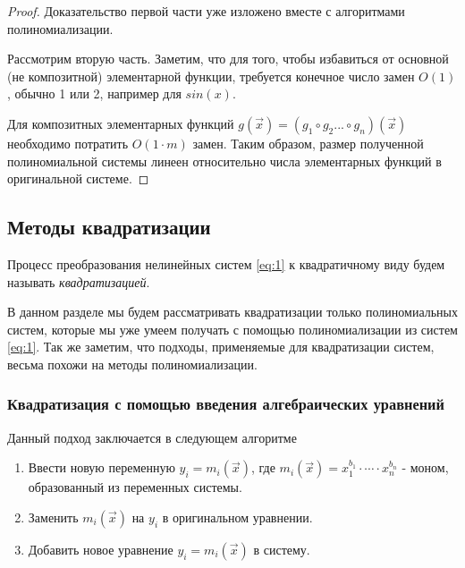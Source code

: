 \begin{proof}
    Доказательство первой части уже изложено вместе с алгоритмами полиномиализации.
    
    Рассмотрим вторую часть.
    Заметим, что для того, чтобы избавиться от основной (не композитной) элементарной функции,
    требуется конечное число замен $O(1)$, обычно 1 или 2, например для $sin(x)$.
    
    Для композитных элементарных функций $g(\vec x) = (g_1 \circ g_2 ... \circ g_n)(\vec x)$ необходимо потратить $O(1 \cdot m)$ замен.
    Таким образом, размер полученной полиномиальной системы линеен относительно числа элементарных функций в оригинальной системе.
\end{proof}


\subsection{Методы квадратизации}

\begin{definition}
    Процесс преобразования нелинейных систем \ref{eq:1} к квадратичному виду будем называть \textit{квадратизацией}.
\end{definition}

В данном разделе мы будем рассматривать квадратизации только полиномиальных систем, которые мы уже умеем получать с помощью полиномиализации из систем \ref{eq:1}. Так же заметим, что подходы, применяемые для квадратизации систем, весьма похожи на методы полиномиализации.

\subsubsection{Квадратизация с помощью введения алгебраических уравнений}

Данный подход заключается в следующем алгоритме

\begin{enumerate}
    \item Ввести новую переменную $y_i = m_i(\vec x)$, где $m_i(\vec x) = x_1^{b_1}\cdot \cdots \cdot x_n^{b_n}$ - моном, образованный из переменных системы.
    \item Заменить $m_i(\vec x)$ на $y_i$ в оригинальном уравнении.
    \item Добавить новое уравнение $y_i = m_i(\vec x)$ в систему.
\end{enumerate}

